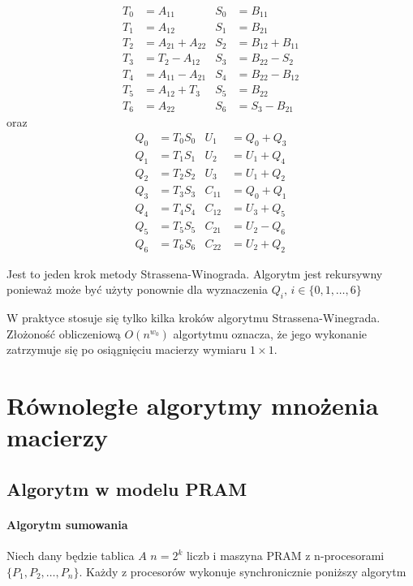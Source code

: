 \documentclass[a4paper,oneside,leqno,12pt]{book}
\theoremstyle{definition}
\theoremstyle{plain}
\theoremstyle{remark}
\begin{document}
\begin{align*}
T_0& = A_{11}& S_0 &= B_{11}\\
T_1& = A_{12}& S_1 &= B_{21}\\
T_2& = A_{21} + A_{22}& S_2 &= B_{12}+B_{11}\\
T_3& = T_2 - A_{12}& S_3 &= B_{22}-S_2\\
T_4& = A_{11}-A_{21}& S_4 &= B_{22}-B_{12}\\
T_5& = A_{12}+T_3& S_5 &= B_{22}\\
T_6& = A_{22}& S_6 &= S_3-B_{21}
\end{align*}
oraz
\begin{align*}
Q_0& = T_{0}S_{0}& U_1 &= Q_{0} + Q_{3}\\
Q_1& = T_{1}S_{1}& U_2 &= U_{1} + Q_{4}\\
Q_2& = T_{2}S_{2}& U_3 &= U_{1} + Q_{2}\\
Q_3& = T_{3}S_{3}& C_{11} &= Q_{0} + Q_{1}\\
Q_4& = T_{4}S_{4}& C_{12} &= U_{3} + Q_{5}\\
Q_5& = T_{5}S_{5}& C_{21} &= U_{2} - Q_{6}\\
Q_6& = T_{6}S_{6}& C_{22} &= U_{2} + Q_{2}
\end{align*}

Jest to jeden krok metody Strassena-Winograda. Algorytm jest rekursywny ponieważ może być użyty ponownie dla wyznaczenia \(Q_i,\,i\in\{0,1,\dots,6\}\)

W praktyce stosuje się tylko kilka kroków algorytmu Strassena-Winegrada\cite{DBLP:journals/corr/abs-1202-3173}. Złożoność obliczeniową \(O(n^{w_0})\) algortytmu oznacza, że jego wykonanie zatrzymuje się po osiągnięciu macierzy wymiaru \(1\times 1\).

\chapter{Równoległe algorytmy mnożenia macierzy}

\section{Algorytm w modelu PRAM}
\subsubsection{Algorytm sumowania}
Niech dany będzie tablica \(A\) \(n=2^k\) liczb i maszyna PRAM z n-procesorami \(\{P_1, P_2, \dots, P_n\}\). Każdy z procesorów wykonuje synchronicznie poniższy algorytm
\end{document}
